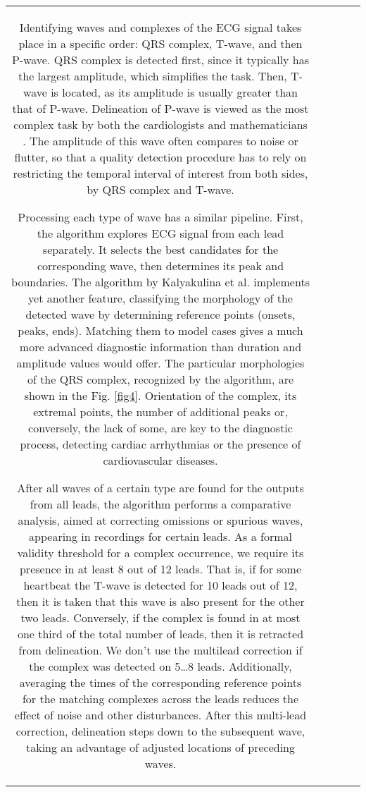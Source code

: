\documentclass[submitted]{ieeeaccess}
\newcommand{\NewCorrection}[1]{{#1}}
\begin{document}
\begin{table}
\begin{tabular}{|c|c|c|c|c|}
Identifying waves and complexes of the ECG signal takes place in a specific order: QRS complex, T-wave, and then P-wave. QRS complex is detected first, since it typically has the largest amplitude, which simplifies the task. Then, T-wave is located, as its amplitude is usually greater than that of P-wave. Delineation of P-wave is viewed as the most complex task by both the cardiologists and mathematicians \cite{DiMarco2011, Martinez2004}. The amplitude of this wave often compares to noise or flutter, so that a quality detection procedure has to rely on restricting the temporal interval of interest from both sides, by QRS complex and T-wave.

Processing each type of wave has a similar pipeline. First, the algorithm explores ECG signal from each lead separately. It selects the best candidates for the corresponding wave, then determines its peak and boundaries. The algorithm by Kalyakulina et al. \cite{Kalyakulina2018} implements yet another feature, classifying the morphology of the detected wave by determining reference points (onsets, peaks, ends). Matching them to model cases gives a much more advanced diagnostic information than duration and amplitude values would offer. The particular morphologies of the QRS complex, recognized by the algorithm, are shown in the Fig. \ref{fig4}. Orientation of the complex, its extremal points, the number of additional peaks or, conversely, the lack of some, are key to the diagnostic process, detecting cardiac arrhythmias or the presence of cardiovascular diseases.


After all waves of a certain type are found for the outputs from all leads, the algorithm performs a comparative analysis, aimed at correcting omissions or spurious waves, appearing in recordings for certain leads. As a formal validity threshold for a complex occurrence, we require its presence in at least 8 out of 12 leads. That is, if for some heartbeat the T-wave is detected for 10 leads out of 12, then it is taken that this wave is also present for the other two leads. Conversely, if the complex is found in \NewCorrection{at most} one third of the total number of leads, then it is retracted from delineation. \NewCorrection{We don’t use the multilead correction if the complex was detected on 5\dots8 leads.} Additionally, averaging the times of the corresponding reference points for the matching complexes across the leads reduces the effect of noise and other disturbances. After this multi-lead correction, delineation steps down to the subsequent wave, taking an advantage of adjusted locations of preceding waves.



\end{tabular}
\end{table}
\end{document}
